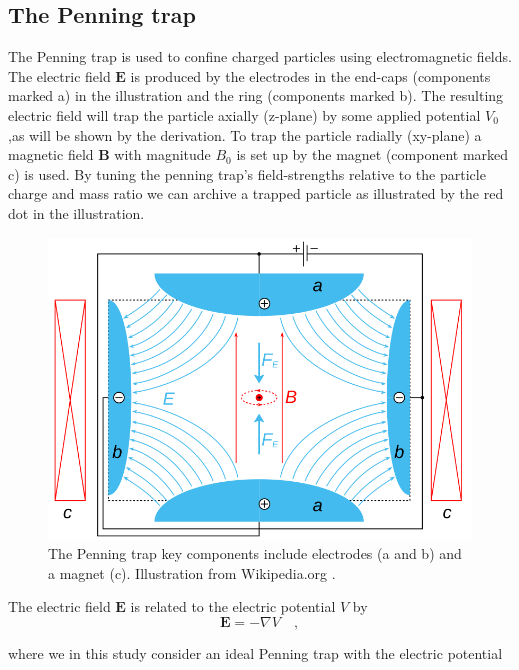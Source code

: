 \documentclass[../main_proj3.tex]{subfiles}
\begin{document}
\subsection{The Penning trap}

The Penning trap is used to confine charged particles using electromagnetic fields. The electric field  $\mathbf{E}$ is produced by the electrodes in the end-caps (components marked a) in the illustration and the ring (components marked b). The resulting electric field will trap the particle axially (z-plane) by some applied potential $V_0$,as will be shown by the derivation. To trap the particle radially (xy-plane) a magnetic field $\mathbf{B}$ with magnitude $B_0$ is set up by the magnet (component marked c) is used. By tuning the penning trap's field-strengths relative to the particle charge and mass ratio we can archive a trapped particle as illustrated by the red dot in the illustration.

\begin{figure}[h!]
    \centering
    \includegraphics[width=0.9\linewidth]{Project 3/figures/Penning_Trap.png}
    \caption{The Penning trap key components include electrodes (a and b) and a magnet (c). Illustration from Wikipedia.org \cite{PenningTrapIllustration}.}
    \label{fig:Penning_trap}
\end{figure}


The electric field $\mathbf{E}$ is related to the electric potential $V$ by 
\begin{equation}
\label{eq:electric_field-electric_potential}
\mathbf{E} = - \nabla V \quad, 
\end{equation}

where we in this study consider an ideal Penning trap with the electric potential
\end{document}
